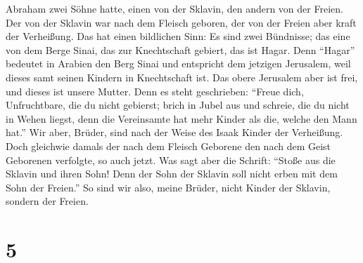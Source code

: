 Abraham zwei Söhne hatte, einen von der Sklavin, den andern von der
Freien.  Der von der Sklavin war nach dem Fleisch
geboren, der von der Freien aber kraft der Verheißung. 
Das hat einen bildlichen Sinn: Es sind zwei Bündnisse; das eine von dem
Berge Sinai, das zur Knechtschaft gebiert, das ist Hagar.
 Denn ``Hagar'' bedeutet in Arabien den Berg Sinai und
entspricht dem jetzigen Jerusalem, weil dieses samt seinen Kindern in
Knechtschaft ist.  Das obere Jerusalem aber ist frei, und
dieses ist unsere Mutter.  Denn es steht geschrieben:
``Freue dich, Unfruchtbare, die du nicht gebierst; brich in Jubel aus
und schreie, die du nicht in Wehen liegst, denn die Vereinsamte hat mehr
Kinder als die, welche den Mann hat.''  Wir aber, Brüder,
sind nach der Weise des Isaak Kinder der Verheißung. 
Doch gleichwie damals der nach dem Fleisch Geborene den nach dem Geist
Geborenen verfolgte, so auch jetzt.  Was sagt aber die
Schrift: ``Stoße aus die Sklavin und ihren Sohn! Denn der Sohn der
Sklavin soll nicht erben mit dem Sohn der Freien.''  So
sind wir also, meine Brüder, nicht Kinder der Sklavin, sondern der
Freien.

\hypertarget{section-4}{%
\section{5}\label{section-4}}

